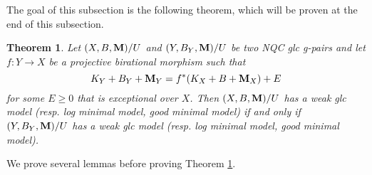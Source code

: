\documentclass[11pt]{amsart}
\numberwithin{equation}{section}
\newcommand{\Mm}{{\bf{M}}}
\newtheorem{thm}{Theorem}[section]
\theoremstyle{definition}
\theoremstyle{definition}
\theoremstyle{definition}
\begin{document}
The goal of this subsection is the following theorem, which will be proven at the end of this subsection.

\begin{thm}\label{thm: existence good minimal model under pullbacks}
Let $(X,B,\Mm)/U$ and $(Y,B_Y,\Mm)/U$ be two NQC glc g-pairs and let $f: Y\rightarrow X$ be a projective birational morphism such that
$$K_Y+B_Y+\Mm_Y=f^*(K_X+B+\Mm_X)+E$$
for some $E\geq 0$ that is exceptional over $X$. Then $(X,B,\Mm)/U$ has a weak glc model (resp. log minimal model, good minimal model) if and only if $(Y,B_Y,\Mm)/U$ has a weak glc model (resp. log minimal model, good minimal model).
\end{thm}

We prove several lemmas before proving Theorem \ref{thm: existence good minimal model under pullbacks}. 
\end{document}
